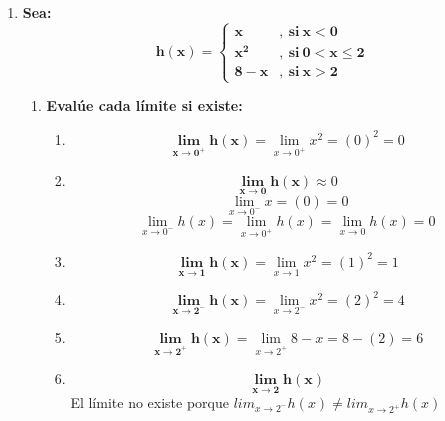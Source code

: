 \documentclass[12pt]{article}
\begin{document}
\begin{enumerate}[label=\textbf{\arabic*.}]
            \vspace{1cm}\hrule
            \item \textbf{Sea: }
                \[
                    \boldsymbol{
                        h(x) = 
                        \left\{
                            \begin{array}{ll}
                                x & ,\ \text{si} \ x < 0 \\
                                x ^2 & ,\ \text{si} \ 0 < x \leq 2 \\
                                8 - x & ,\ \text{si} \ x > 2
                            \end{array}
                        \right.
                    }
                \]

                \begin{enumerate}[label=\textbf{(\alph*)}]
                    \item \textbf{Evalúe cada límite si existe:} 
                        \begin{enumerate}[label=\textbf{(\roman*)}]
                            \item \[\bm{\lim_{x \to 0^+} h(x)} = \lim_{x \to 0^+} x^2 = (0)^2 = 0\]
                            \item \[\bm{\lim_{x \to 0} h(x)} \approx 0\] \[\lim_{x \to 0^-} x = (0) = 0 \] \[\lim_{x \to 0^-} h(x) = \lim_{x \to 0^+} h(x) = \lim_{x \to 0} h(x) = 0\]
                            \item \[\bm{\lim_{x \to 1} h(x)} = \lim_{x \to 1} x^2 = (1)^2 = 1\] 
                            \item \[\bm{\lim_{x \to 2^-} h(x)} = \lim_{x \to 2^-} x^2 = (2)^2 = 4\]
                            \item \[\bm{\lim_{x \to 2^+} h(x)} = \lim_{x \to 2^+} 8 - x = 8 - (2) = 6\]
                            \item \[\bm{\lim_{x \to 2} h(x)}\] El límite no existe porque $lim_{x \to 2^-} h(x) \neq lim_{x \to 2^+} h(x)$
                        \end{enumerate}


\end{enumerate}
\end{enumerate}
\end{document}
